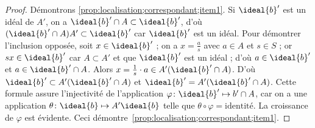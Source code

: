 \documentclass[11pt, useosf,
  title in boldface,
  theorem in new line,
  theorem numbering = section,
  number theorems separately,
]{simplivre}
\begin{document}
    \begin{proof}
        Démontrons \ref{prop:localisation;correspondant;item1}. Si \( \ideal{b}' \) est un idéal de \( A' \), on a \( \ideal{b}' \cap A \subset \ideal{b}' \), d'où \( (\ideal{b}' \cap A) A' \subset \ideal{b}' \) car \( \ideal{b}' \) est un idéal. Pour démontrer l'inclusion opposée, soit \( x \in \ideal{b}' \) ; on a \( x = \frac{a}{s} \) avec \( a \in A \) et \( s \in S \) ; or \( sx \in \ideal{b}' \) car \( A \subset A' \) et que \( \ideal{b}' \) est un idéal ; d'où \( a \in \ideal{b}' \) et \( a \in \ideal{b}' \cap A \). Alors \( x = \frac{1}{s} \cdot a \in A' (\ideal{b}' \cap A) \). D'où \( \ideal{b}' \subset A'(\ideal{b}' \cap A) \) et \( \ideal{b}' = A'(\ideal{b}' \cap A) \). Cette formule assure l'injectivité de l'application \( \varphi \colon \ideal{b}' \mapsto {b}' \cap A \), car on a une application \( \theta \colon \ideal{b} \mapsto A' \ideal{b} \) telle que \( \theta \circ \varphi = \text{identité} \). La croissance de \( \varphi \) est évidente. Ceci démontre~\ref{prop:localisation;correspondant;item1}.


\end{proof}
\end{document}

